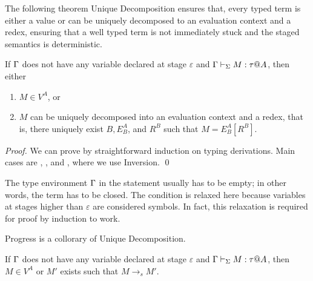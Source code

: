 The following theorem Unique Decomposition ensures that, every typed
term is either a value or can be uniquely decomposed to an evaluation
context and a redex, ensuring that a well typed term is not
immediately stuck and the staged semantics is deterministic.

\begin{theorem}
  If $\Gamma$ does not have any variable declared at stage $\varepsilon$ 
  and $\Gamma \vdash_\Sigma M : \tau @ A$, then either
  \begin{enumerate}
  \item $ M \in V^A$, or
  \item $M$ can be uniquely decomposed into an evaluation context and a redex, that is, there uniquely exist $B, E^A_B$, and $R^B$ such that $M = E^A_B[R^B]$.
  \end{enumerate}
\end{theorem}

\begin{proof}
  We can prove by straightforward induction on typing derivations.
  Main cases are \TApp, \TTBL, and \TIns, where we use Inversion.
  \qed
\end{proof}

The type environment $\Gamma$ in the statement usually has to be empty;
in other words, the term has to be closed.  The condition is relaxed here
because variables at stages higher than \(\varepsilon\) are considered
symbols.  In fact, this relaxation is required for proof by induction
to work.

      
Progress is a collorary of Unique Decomposition.

\begin{corollary}[Progress]
	If $\Gamma$ does not have any variable declared at stage $\varepsilon$ and $\Gamma \vdash_\Sigma M : \tau  @ A$, then
	$ M \in V^A $ or $M'$ exists such that $M \longrightarrow_s M'$.
\end{corollary}

